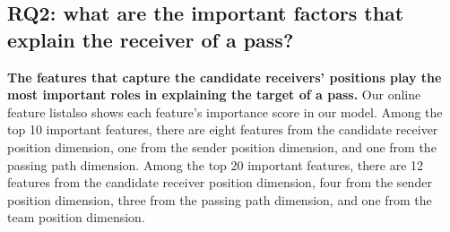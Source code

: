 \subsection{RQ2: what are the important factors that explain the receiver of a pass?}\label{RQ3-results}

\textbf{The features that capture the candidate receivers' positions play the most important roles in explaining the target of a pass.}
Our online feature list\footnotemark[\ref{feature-list}] also shows each feature's importance score in our model.
Among the top 10 important features, there are eight features from the candidate receiver position dimension, one from the sender position dimension, and one from the passing path dimension.
Among the top 20 important features, there are 12 features from the candidate receiver position dimension, four from the sender position dimension, three from the passing path dimension, and one from the team position dimension.
